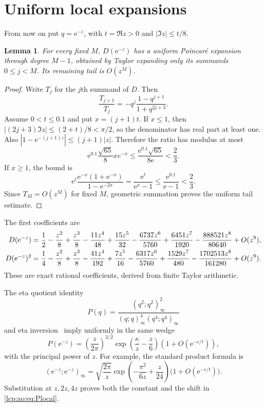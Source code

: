 \documentclass[11pt]{article}
\numberwithin{equation}{section}
\newtheorem{lemma}[theorem]{Lemma}
\theoremstyle{definition}\newtheorem{definition}[theorem]{Definition}
\theoremstyle{remark}\newtheorem{remark}[theorem]{Remark}
\newcommand{\ee}{\mathrm e}
\begin{document}
\section{Uniform local expansions}\label{lcp:ao:sec:local}
From now on put $q=\ee^{-z}$, with $t=\Re z>0$ and $|\Im z|\le t/8$.
\begin{lemma}\label{lcp:ao:lem:localD}
For every fixed $M$, $D(\ee^{-z})$ has a uniform Poincar\'e expansion through degree $M-1$, obtained by Taylor expanding only its summands $0\le j<M$. Its remaining tail is $O(z^M)$.
\end{lemma}
\begin{proof}
Write $T_j$ for the $j$th summand of $D$. Then
\[
\frac{T_{j+1}}{T_j}=-q^j\frac{1-q^{j+1}}{1+q^{2j+3}}.
\]
Assume $0<t\le0.1$ and put $x=(j+1)t$. If $x\le1$, then
$|(2j+3)\Im z|\le(2+t)/8<\pi/2$, so the denominator has real part at least one. Also $|1-\ee^{-(j+1)z}|\le(j+1)|z|$. Therefore the ratio has modulus at most
\[
\ee^{0.1}\frac{\sqrt{65}}8xe^{-x}\le\frac{\ee^{0.1}\sqrt{65}}{8\ee}<\frac23.
\]
If $x\ge1$, the bound is
\[
\ee^t\frac{\ee^{-x}(1+\ee^{-x})}{1-\ee^{-2x}}
=\frac{\ee^t}{\ee^x-1}\le\frac{\ee^{0.1}}{\ee-1}<\frac23.
\]
Since $T_M=O(z^M)$ for fixed $M$, geometric summation proves the uniform tail estimate.
\end{proof}
The first coefficients are
\begin{align}\label{lcp:ao:eq:Dexp}
D(\ee^{-z})={}&\frac12-\frac{z^2}{8}+\frac{z^3}{8}-\frac{11z^4}{48}
 +\frac{15z^5}{32}-\frac{6737z^6}{5760}
 +\frac{6451z^7}{1920}-\frac{888521z^8}{80640}+O(z^9),\notag\\
D(\ee^{-z})^2={}&\frac14-\frac{z^2}{8}+\frac{z^3}{8}-\frac{41z^4}{192}
 +\frac{7z^5}{16}-\frac{6317z^6}{5760}
 +\frac{1529z^7}{480}-\frac{1702513z^8}{161280}+O(z^9).
\end{align}
These are exact rational coefficients, derived from finite Taylor arithmetic.

The eta quotient identity
\begin{equation}\label{lcp:ao:eq:eta}
P(q)=\frac{(q^2;q^2)_\infty^2}{(q;q)_\infty^4(q^4;q^4)_\infty}
\end{equation}
and eta inversion~\cite[23.18.5]{lcp-ao-dlmf} imply uniformly in the same wedge
\begin{equation}\label{lcp:ao:eq:Plocal}
 P(\ee^{-z})=\left(\frac{z}{2\pi}\right)^{3/2}
 \exp\!\left(\frac\kappa z-\frac z6\right)
 \left(1+O(\ee^{-c/t})\right),
\end{equation}
with the principal power of $z$. For example, the standard product formula is
\[
(\ee^{-z};\ee^{-z})_\infty
=\sqrt{\frac{2\pi}{z}}\exp\!\left(-\frac{\pi^2}{6z}+\frac z{24}\right)
\bigl(1+O(\ee^{-c/t})\bigr).
\]
Substitution at $z,2z,4z$ proves both the constant and the shift in \eqref{lcp:ao:eq:Plocal}.
\end{document}
